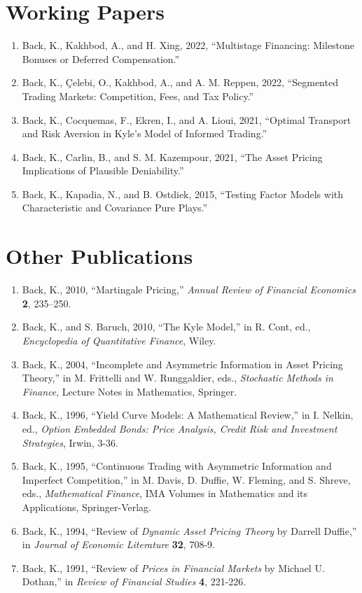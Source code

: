 \documentclass[margin, 11pt]{res}
\begin{document}
\begin{resume}
\section{\sc Working Papers}
\begin{enumerate}
    \item Back, K., Kakhbod, A., and H. Xing, 2022, ``Multistage Financing: Milestone Bonuses or Deferred Compensation.''
    \item Back, K., \c{C}elebi, O., Kakhbod, A., and A. M. Reppen, 2022, ``Segmented Trading Markets: Competition, Fees, and Tax Policy.''
\item Back, K., Cocquemas, F., Ekren, I., and A. Lioui, 2021, ``Optimal Transport and Risk Aversion in Kyle's Model of Informed Trading.''
\item Back, K., Carlin, B., and S. M. Kazempour, 2021, ``The Asset Pricing Implications of Plausible Deniability.''
\item Back, K., Kapadia, N., and B. Ostdiek, 2015, ``Testing Factor Models with Characteristic and Covariance Pure Plays.''

\end{enumerate}

\section{\sc Other Publications}
\begin{enumerate}
\item Back, K., 2010, ``Martingale Pricing,'' \textit{Annual Review of Financial Economics} \textbf{2}, 235--250.
\item Back, K., and S. Baruch, 2010, ``The Kyle Model,'' in R. Cont, ed., \textit{Encyclopedia of Quantitative Finance}, Wiley.
\item Back, K., 2004, ``Incomplete and Asymmetric Information in Asset Pricing Theory,'' in M. Frittelli and W. Runggaldier, eds., \textit{Stochastic Methods in Finance}, Lecture Notes in Mathematics, Springer.
\item Back, K., 1996, ``Yield Curve Models: A Mathematical Review,''
in I. Nelkin, ed., {\em Option Embedded
Bonds: Price Analysis, Credit Risk and Investment Strategies}, Irwin, 3-36.
\item Back, K., 1995, ``Continuous Trading with Asymmetric Information and Imperfect
Competition,'' in M. Davis, D. Duffie, W.
Fleming, and S. Shreve, eds., {\em Mathematical Finance},
IMA Volumes in Mathematics
and its Applications, Springer-Verlag.
\item Back, K., 1994, ``Review of {\em Dynamic Asset Pricing Theory\/} by Darrell Duffie,'' in
{\em Journal of Economic Literature\/} {\bf 32}, 708-9.
\item Back, K., 1991, ``Review of {\em Prices in Financial Markets\/} by Michael U.
Dothan,'' in {\em Review of Financial Studies\/} {\bf 4}, 221-226.
\end{enumerate}


\end{resume}
\end{document}
